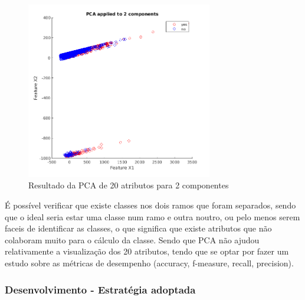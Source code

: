 \documentclass[portugues,final]{revdetua}
\begin{document}
\begin{figure}[H]
\centerline{\includegraphics[width=230pt]{images/svm_pca.png}}
\caption{Resultado da PCA de 20 atributos para 2 componentes}
\label{img:complete}
\end{figure}

É possível verificar que existe classes nos dois ramos que foram separados, sendo que o ideal seria estar uma classe num ramo e outra noutro, ou pelo menos serem faceis de identificar as classes, o que significa que existe atributos que não colaboram muito para o cálculo da classe. Sendo que PCA não ajudou relativamente a visualização dos 20 atributos, tendo que se optar por fazer um estudo sobre as métricas de desempenho (accuracy, f-measure, recall, precision).

\subsubsection{Desenvolvimento - Estratégia adoptada}
\end{document}
